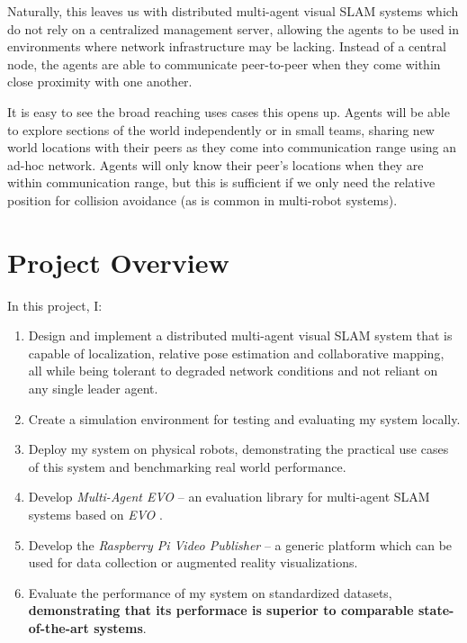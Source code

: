 Naturally, this leaves us with distributed multi-agent visual SLAM systems which do not rely on a centralized management server, allowing the agents to be used in environments where network infrastructure may be lacking. Instead of a central node, the agents are able to communicate peer-to-peer when they come within close proximity with one another.

It is easy to see the broad reaching uses cases this opens up. Agents will be able to explore sections of the world independently or in small teams, sharing new world locations with their peers as they come into communication range using an ad-hoc network. Agents will only know their peer's locations when they are within communication range, but this is sufficient if we only need the relative position for collision avoidance (as is common in multi-robot systems).

\section{Project Overview}
\label{sec:project-overview}
In this project, I: \noparskip
{
    \begin{enumerate}
        \item Design and implement a distributed multi-agent visual SLAM system that is capable of localization, relative pose estimation and  collaborative mapping, all while being tolerant to degraded network conditions and not reliant on any single leader agent.
        \item Create a simulation environment for testing and evaluating my system locally.
        \item Deploy my system on physical robots, demonstrating the practical use cases of this system and benchmarking real world performance.
        \item Develop \textit{Multi-Agent EVO} – an evaluation library for multi-agent SLAM systems based on \textit{EVO} \autocite{grupp2017evo}.
        \item Develop the \textit{Raspberry Pi Video Publisher} – a generic platform which can be used for data collection or augmented reality visualizations.
        \item Evaluate the performance of my system on standardized datasets, \textbf{demonstrating that its performace is superior to comparable state-of-the-art systems}.
    \end{enumerate}
}

